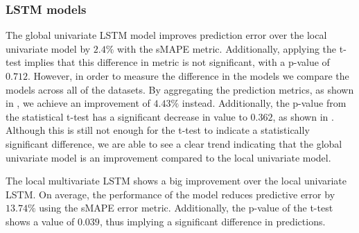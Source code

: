 \subsubsection{LSTM models}
The global univariate LSTM model improves prediction error over the local univariate model
by $2.4\%$ with the sMAPE metric.
Additionally, applying the t-test implies that this difference in metric is not significant,
with a p-value of $0.712$.
However, in order to measure the difference in the models we compare the models across all of the datasets.
By aggregating the prediction metrics, as shown in ,
we achieve an improvement of $4.43\%$ instead. Additionally, the p-value from the statistical t-test
has a significant decrease in value to $0.362$, as shown in .
Although this is still not enough for the t-test to indicate a statistically significant difference,
we are able to see a clear trend indicating that the global univariate model is an improvement compared to the local univariate model.






The local multivariate LSTM shows a big improvement over the local univariate LSTM.
On average, the performance of the model reduces predictive error by $13.74\%$ using the sMAPE error metric.
Additionally, the p-value of the t-test shows a value of $0.039$, thus implying a significant difference in predictions.



